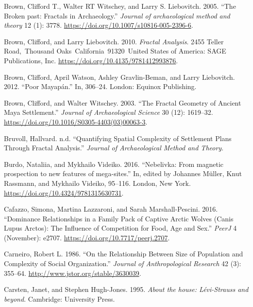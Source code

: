 \documentclass[
  12pt,
  a4paper, twoside]{book}
\newlength{\cslhangindent}
\newlength{\cslentryspacingunit} %
\newenvironment{CSLReferences}[2] %
 {%
  \setlength{\parindent}{0pt}
  \ifodd #1
  \let\oldpar\par
  \def\par{\hangindent=\cslhangindent\oldpar}
  \fi
  \setlength{\parskip}{#2\cslentryspacingunit}
 }%
 {}
\begin{document}
\begin{CSLReferences}{1}{0}
\leavevmode{}%
Brown, Clifford T., Walter RT Witschey, and Larry S. Liebovitch. 2005. {``The Broken past: Fractals in Archaeology.''} \emph{Journal of archaeological method and theory} 12 (1): 3778. \url{https://doi.org/10.1007/s10816-005-2396-6}.

\leavevmode{}%
Brown, Clifford, and Larry Liebovitch. 2010. \emph{Fractal Analysis}. 2455 Teller Road,~Thousand Oaks~California~91320~United States of America: SAGE Publications, Inc. \url{https://doi.org/10.4135/9781412993876}.

\leavevmode{}%
Brown, Clifford, April Watson, Ashley Gravlin-Beman, and Larry Liebovitch. 2012. {``Poor Mayapán.''} In, 306--24. London: Equinox Publishing.

\leavevmode{}%
Brown, Clifford, and Walter Witschey. 2003. {``The Fractal Geometry of Ancient Maya Settlement.''} \emph{Journal of Archaeological Science} 30 (12): 1619--32. \url{https://doi.org/10.1016/S0305-4403(03)00063-3}.

\leavevmode{}%
Bruvoll, Hallvard. n.d. {``Quantifying Spatial Complexity of Settlement Plans Through Fractal Analysis.''} \emph{Journal of Archaeological Method and Theory}.

\leavevmode{}%
Burdo, Nataliia, and Mykhailo Videiko. 2016. {``Nebelivka: From magnetic prospection to new features of mega-sites.''} In, edited by Johannes Müller, Knut Rassmann, and Mykhailo Videiko, 95--116. London, New York. \url{https://doi.org/10.4324/9781315630731}.

\leavevmode{}%
Cafazzo, Simona, Martina Lazzaroni, and Sarah Marshall-Pescini. 2016. {``Dominance Relationships in a Family Pack of Captive Arctic Wolves (Canis Lupus Arctos): The Influence of Competition for Food, Age and Sex.''} \emph{PeerJ} 4 (November): e2707. \url{https://doi.org/10.7717/peerj.2707}.

\leavevmode{}%
Carneiro, Robert L. 1986. {``On the Relationship Between Size of Population and Complexity of Social Organization.''} \emph{Journal of Anthropological Research} 42 (3): 355--64. \url{http://www.jstor.org/stable/3630039}.

\leavevmode{}%
Carsten, Janet, and Stephen Hugh-Jones. 1995. \emph{About the house: Lévi-Strauss and beyond}. Cambridge: University Press.


\end{CSLReferences}
\end{document}
